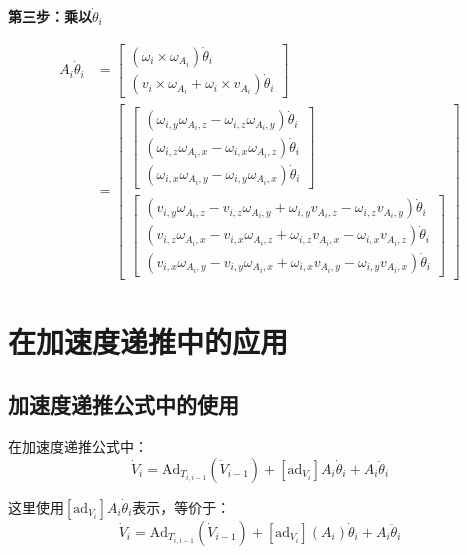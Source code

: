 \documentclass[12pt,a4paper]{article}
\begin{document}
\textbf{第三步：乘以$\dot{\theta}_i$}

\begin{align}
[\text{ad}_{V_i}] A_i \dot{\theta}_i &= \begin{bmatrix}
(\omega_i \times \omega_{A_i}) \dot{\theta}_i \\
(v_i \times \omega_{A_i} + \omega_i \times v_{A_i}) \dot{\theta}_i
\end{bmatrix} \\
&= \begin{bmatrix}
\begin{bmatrix}
(\omega_{i,y} \omega_{A_i,z} - \omega_{i,z} \omega_{A_i,y}) \dot{\theta}_i \\
(\omega_{i,z} \omega_{A_i,x} - \omega_{i,x} \omega_{A_i,z}) \dot{\theta}_i \\
(\omega_{i,x} \omega_{A_i,y} - \omega_{i,y} \omega_{A_i,x}) \dot{\theta}_i
\end{bmatrix} \\
\begin{bmatrix}
(v_{i,y} \omega_{A_i,z} - v_{i,z} \omega_{A_i,y} + \omega_{i,y} v_{A_i,z} - \omega_{i,z} v_{A_i,y}) \dot{\theta}_i \\
(v_{i,z} \omega_{A_i,x} - v_{i,x} \omega_{A_i,z} + \omega_{i,z} v_{A_i,x} - \omega_{i,x} v_{A_i,z}) \dot{\theta}_i \\
(v_{i,x} \omega_{A_i,y} - v_{i,y} \omega_{A_i,x} + \omega_{i,x} v_{A_i,y} - \omega_{i,y} v_{A_i,x}) \dot{\theta}_i
\end{bmatrix}
\end{bmatrix}
\end{align}

\section{在加速度递推中的应用}

\subsection{加速度递推公式中的使用}

在加速度递推公式中：
\begin{equation}
\dot{V}_i = \text{Ad}_{T_{i,i-1}}(\dot{V}_{i-1}) + [\text{ad}_{V_i}] A_i \dot{\theta}_i + A_i \ddot{\theta}_i
\end{equation}

这里使用$[\text{ad}_{V_i}] A_i \dot{\theta}_i$表示，等价于：
\begin{equation}
\dot{V}_i = \text{Ad}_{T_{i,i-1}}(\dot{V}_{i-1}) + [\text{ad}_{V_i}](A_i) \dot{\theta}_i + A_i \ddot{\theta}_i
\end{equation}
\end{document}
